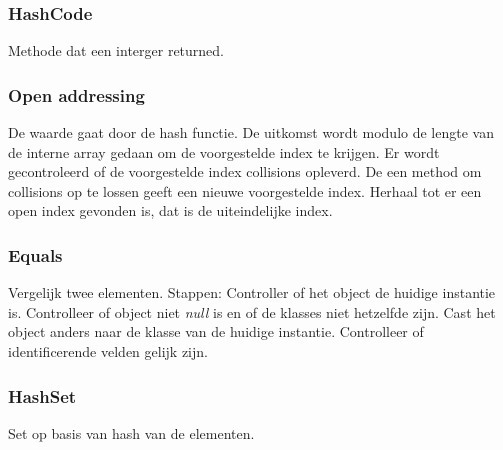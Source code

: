 \subsubsection{HashCode}
Methode dat een interger returned.

\subsubsection{Open addressing}
De waarde gaat door de hash functie.
De uitkomst wordt modulo de lengte van de interne array gedaan om de voorgestelde index te krijgen.
Er wordt gecontroleerd of de voorgestelde index collisions opleverd.
De een method om collisions op te lossen geeft een nieuwe voorgestelde index.
Herhaal tot er een open index gevonden is, dat is de uiteindelijke index.

\subsubsection{Equals}
Vergelijk twee elementen.
Stappen:
Controller of het object de huidige instantie is.
Controlleer of object niet \textit{null} is en of de klasses niet hetzelfde zijn.
Cast het object anders naar de klasse van de huidige instantie.
Controlleer of identificerende velden gelijk zijn.

\subsubsection{HashSet}
Set op basis van hash van de elementen. 
